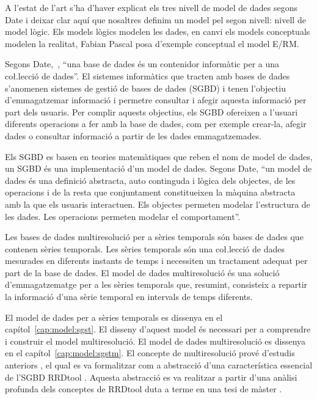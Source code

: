A l'estat de l'art s'ha d'haver explicat els tres nivell de model de dades segons Date i deixar clar aquí que nosaltres definim un model pel segon nivell: nivell de model lògic. Els models lògics modelen les dades, en canvi els models conceptuals modelen la realitat, Fabian Pascal posa d'exemple conceptual el model E/RM.



Segons Date,~\cite{date:introduction}, ``una base de dades és un contenidor informàtic per a una co\l.lecció de dades''. El sistemes informàtics que tracten amb bases de dades s'anomenen sistemes de gestió de bases de dades (SGBD) i tenen l'objectiu d'emmagatzemar informació i permetre consultar i afegir aquesta informació  per part dels usuaris.
Per complir aquests objectius, els SGBD ofereixen a l'usuari diferents operacions a fer amb la base de dades, com per exemple crear-la, afegir dades o consultar informació a partir de les dades emmagatzemades.

Els SGBD es basen en teories matemàtiques que reben el nom de model de dades, un SGBD és una implementació d'un model de dades.
Segons Date, ``un model de dades és una definició abstracta, auto continguda i lògica dels objectes, de les operacions i  de la resta que conjuntament constitueixen la màquina abstracta amb la que els usuaris interactuen. Els objectes permeten modelar l'estructura de les dades. Les operacions permeten modelar el comportament''.

Les bases de dades multiresolució per a sèries temporals són bases de dades que contenen sèries temporals. Les sèries temporals són una co\l.lecció de dades mesurades en diferents instants de temps i necessiten un tractament adequat per part de la base de dades. 
El model de dades multiresolució és una solució d'emmagatzematge per a les sèries temporals que, resumint, consisteix a repartir la informació d'una sèrie temporal en intervals de temps diferents.


El model de dades per a sèries temporals es dissenya en el
capítol~\ref{cap:model:sgst}. El disseny d'aquest model és necessari
per a comprendre i construir el model multiresolució.  El model de
dades multiresolució es dissenya en el capítol~\ref{cap:model:sgstm}.
El concepte de multiresolució prové d'estudis anteriors
\parencite{llusa12:ptd}, el qual es va formalitzar com a abstracció
d'una característica essencial de l'SGBD
RRDtool \parencite{rrdtool}. Aquesta abstracció es va realitzar a
partir d'una anàlisi profunda dels conceptes de RRDtool duta a terme
en una tesi de màster \parencite{llusa11:tfm}.



